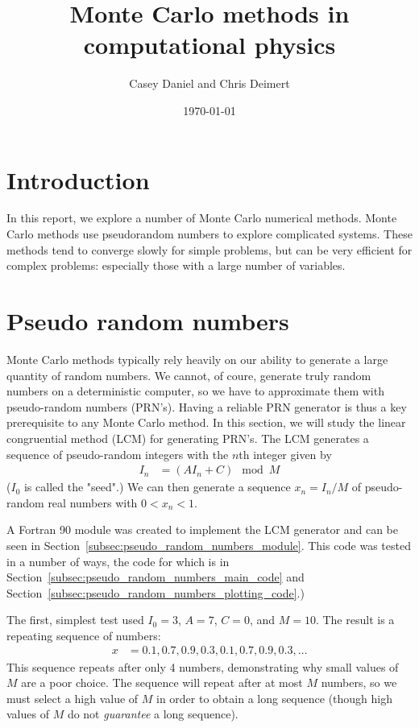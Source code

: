 \documentclass[twocolumn]{myarticle}
\begin{document}
\title{Monte Carlo methods in computational physics}
\author{Casey Daniel and Chris Deimert}
\date{\today}

\maketitle

\section{Introduction}
\label{sec:introduction}

In this report, we explore a number of Monte Carlo numerical methods.
Monte Carlo methods use pseudorandom numbers to explore complicated systems.
These methods tend to converge slowly for simple problems, but can be very efficient for complex problems: especially those with a large number of variables.

\section{Pseudo random numbers}
\label{sec:pseudo_random_numbers}

Monte Carlo methods typically rely heavily on our ability to generate a large quantity of random numbers.
We cannot, of coure, generate truly random numbers on a deterministic computer, so we have to approximate them with pseudo-random numbers (PRN's).
Having a reliable PRN generator is thus a key prerequisite to any Monte Carlo method.
In this section, we will study the linear congruential method (LCM) for generating PRN's.
The LCM generates a sequence of pseudo-random integers with the $ n $th integer given by
\begin{align}
    I_{n} &= \left( A I_n + C \right) \! \! \! \! \! \mod M
\end{align}
($ I_0 $ is called the "seed".)
We can then generate a sequence $ x_n = I_n/M $ of pseudo-random real numbers with $ 0 < x_n < 1 $.

A Fortran 90 module was created to implement the LCM generator and can be seen in Section~\ref{subsec:pseudo_random_numbers_module}.
This code was tested in a number of ways, the code for which is in Section~\ref{subsec:pseudo_random_numbers_main_code} and Section~\ref{subsec:pseudo_random_numbers_plotting_code}.)

The first, simplest test used $ I_0 = 3 $, $ A = 7 $, $ C = 0 $, and $ M = 10 $.
The result is a repeating sequence of numbers:
\begin{align}
    x &= 0.1, 0.7, 0.9, 0.3, 0.1, 0.7, 0.9, 0.3, \ldots
\end{align}
This sequence repeats after only 4 numbers, demonstrating why small values of $ M $ are a poor choice.
The sequence will repeat after at most $ M $ numbers, so we must select a high value of $ M $ in order to obtain a long sequence (though high values of $ M $ do not \emph{guarantee} a long sequence).
\end{document}
